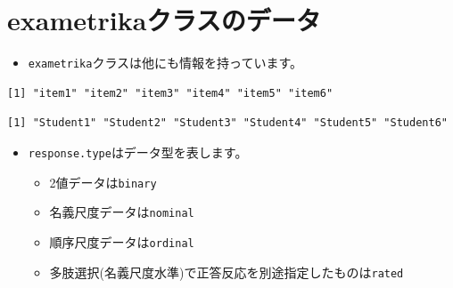 \documentclass[
  a4paper,
]{ltjsbook}
\newenvironment{Shaded}{\begin{snugshade}}{\end{snugshade}}
\newcommand{\FunctionTok}[1]{\textcolor[rgb]{0.28,0.35,0.67}{#1}}
\newcommand{\NormalTok}[1]{\textcolor[rgb]{0.00,0.23,0.31}{#1}}
\newcommand{\SpecialCharTok}[1]{\textcolor[rgb]{0.37,0.37,0.37}{#1}}
\providecommand{\tightlist}{%
  \setlength{\itemsep}{0pt}\setlength{\parskip}{0pt}}\usepackage{longtable,booktabs,array}
\begin{document}
\section{exametrikaクラスのデータ}\label{exametrikaux30afux30e9ux30b9ux306eux30c7ux30fcux30bf-1}

\begin{itemize}
\tightlist
\item
  \texttt{exametrika}クラスは他にも情報を持っています。
\end{itemize}

\begin{Shaded}
\end{Shaded}

\begin{verbatim}
[1] "item1" "item2" "item3" "item4" "item5" "item6"
\end{verbatim}

\begin{Shaded}
\end{Shaded}

\begin{verbatim}
[1] "Student1" "Student2" "Student3" "Student4" "Student5" "Student6"
\end{verbatim}

\begin{itemize}
\tightlist
\item
  \texttt{response.type}はデータ型を表します。

  \begin{itemize}
  \tightlist
  \item
    2値データは\texttt{binary}
  \item
    名義尺度データは\texttt{nominal}
  \item
    順序尺度データは\texttt{ordinal}
  \item
    多肢選択(名義尺度水準)で正答反応を別途指定したものは\texttt{rated}
  \end{itemize}
\end{itemize}

\begin{Shaded}
\end{Shaded}
\end{document}
